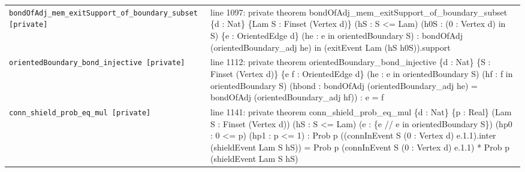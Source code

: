 \documentclass[10pt]{article}
\begin{document}
\begin{longtable}{>{\raggedright\arraybackslash}p{} >{\raggedright\arraybackslash}p{}}
\texttt{bondOfAdj\_\allowbreak{}mem\_\allowbreak{}exitSupport\_\allowbreak{}of\_\allowbreak{}boundary\_\allowbreak{}subset [private]} & {\ttfamily\scriptsize line 1097:\allowbreak{} private theorem bondOfAdj\_\allowbreak{}mem\_\allowbreak{}exitSupport\_\allowbreak{}of\_\allowbreak{}boundary\_\allowbreak{}subset \{d :\allowbreak{} Nat\} \{Lam S :\allowbreak{} Finset (\allowbreak{}Vertex d)\allowbreak{}\} (\allowbreak{}hS :\allowbreak{} S <=\allowbreak{} Lam)\allowbreak{} (\allowbreak{}h0S :\allowbreak{} (\allowbreak{}0 :\allowbreak{} Vertex d)\allowbreak{} in S)\allowbreak{} \{e :\allowbreak{} OrientedEdge d\} (\allowbreak{}he :\allowbreak{} e in orientedBoundary S)\allowbreak{} :\allowbreak{} bondOfAdj (\allowbreak{}orientedBoundary\_\allowbreak{}adj he)\allowbreak{} in (\allowbreak{}exitEvent Lam (\allowbreak{}hS h0S)\allowbreak{})\allowbreak{}.\allowbreak{}support} \\[0.45em]
\texttt{orientedBoundary\_\allowbreak{}bond\_\allowbreak{}injective [private]} & {\ttfamily\scriptsize line 1112:\allowbreak{} private theorem orientedBoundary\_\allowbreak{}bond\_\allowbreak{}injective \{d :\allowbreak{} Nat\} \{S :\allowbreak{} Finset (\allowbreak{}Vertex d)\allowbreak{}\} \{e f :\allowbreak{} OrientedEdge d\} (\allowbreak{}he :\allowbreak{} e in orientedBoundary S)\allowbreak{} (\allowbreak{}hf :\allowbreak{} f in orientedBoundary S)\allowbreak{} (\allowbreak{}hbond :\allowbreak{} bondOfAdj (\allowbreak{}orientedBoundary\_\allowbreak{}adj he)\allowbreak{} =\allowbreak{} bondOfAdj (\allowbreak{}orientedBoundary\_\allowbreak{}adj hf)\allowbreak{})\allowbreak{} :\allowbreak{} e =\allowbreak{} f} \\[0.45em]
\texttt{conn\_\allowbreak{}shield\_\allowbreak{}prob\_\allowbreak{}eq\_\allowbreak{}mul [private]} & {\ttfamily\scriptsize line 1141:\allowbreak{} private theorem conn\_\allowbreak{}shield\_\allowbreak{}prob\_\allowbreak{}eq\_\allowbreak{}mul \{d :\allowbreak{} Nat\} \{p :\allowbreak{} Real\} (\allowbreak{}Lam S :\allowbreak{} Finset (\allowbreak{}Vertex d)\allowbreak{})\allowbreak{} (\allowbreak{}hS :\allowbreak{} S <=\allowbreak{} Lam)\allowbreak{} (\allowbreak{}e :\allowbreak{} \{e /\allowbreak{}/\allowbreak{} e in orientedBoundary S\})\allowbreak{} (\allowbreak{}hp0 :\allowbreak{} 0 <=\allowbreak{} p)\allowbreak{} (\allowbreak{}hp1 :\allowbreak{} p <=\allowbreak{} 1)\allowbreak{} :\allowbreak{} Prob p (\allowbreak{}(\allowbreak{}connInEvent S (\allowbreak{}0 :\allowbreak{} Vertex d)\allowbreak{} e.\allowbreak{}1.\allowbreak{}1)\allowbreak{}.\allowbreak{}inter (\allowbreak{}shieldEvent Lam S hS)\allowbreak{})\allowbreak{} =\allowbreak{} Prob p (\allowbreak{}connInEvent S (\allowbreak{}0 :\allowbreak{} Vertex d)\allowbreak{} e.\allowbreak{}1.\allowbreak{}1)\allowbreak{} *\allowbreak{} Prob p (\allowbreak{}shieldEvent Lam S hS)\allowbreak{}} \\[0.45em]

\end{longtable}
\end{document}
